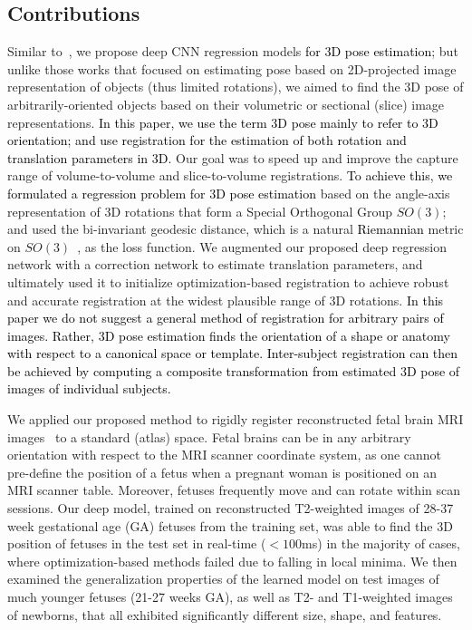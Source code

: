 \documentclass[journal,transmag]{IEEEtran}
\begin{document}
\subsection{Contributions}

Similar to~\cite{miao2016real,miao2016cnn,mahendran20173d}, we propose deep CNN regression models \textcolor{black}{for 3D pose estimation}; but unlike those works that focused on estimating pose based on 2D-projected image representation of objects (thus limited rotations), we aimed to find the 3D pose of arbitrarily-oriented objects based on their volumetric or sectional (slice) image representations. \textcolor{black}{In this paper, we use the term 3D pose mainly to refer to 3D orientation; and use registration for the estimation of both rotation and translation parameters in 3D.} Our goal was to speed up and improve the capture range of volume-to-volume and slice-to-volume registrations. \textcolor{black}{To achieve this, we formulated a regression problem for 3D pose estimation} based on the angle-axis representation of 3D rotations that form a Special Orthogonal Group $SO(3)$; and used the bi-invariant geodesic distance, which is a natural \textcolor{black}{Riemannian} metric on $SO(3)$~\cite{huynh2009metrics}, as the loss function. We augmented our proposed deep regression network with a correction network to estimate translation parameters, and ultimately used it to initialize optimization-based registration to achieve robust and accurate registration at the widest plausible range of 3D rotations. \textcolor{black}{In this paper we do not suggest a general method of registration for arbitrary pairs of images. Rather, 3D pose estimation finds the orientation of a shape or anatomy with respect to a canonical space or template. Inter-subject registration can then be achieved by computing a composite transformation from estimated 3D pose of images of individual subjects.}

We applied our proposed method to rigidly register reconstructed fetal brain MRI images~\cite{gholipour2010robust} to a standard (atlas) space. Fetal brains can be in any arbitrary orientation with respect to the MRI scanner coordinate system, as one cannot pre-define the position of a fetus when a pregnant woman is positioned on an MRI scanner table. Moreover, fetuses frequently move and can rotate within scan sessions. Our deep model, trained on reconstructed T2-weighted images of 28-37 week gestational age (GA) fetuses from the training set, was able to find the 3D position of fetuses in the test set in real-time ($<100$ms) in the majority of cases, where optimization-based methods failed due to falling in local minima. We then examined the generalization properties of the learned model on test images of much younger fetuses (21-27 weeks GA), as well as T2- and T1-weighted images of newborns, that all exhibited significantly different size, shape, and features.
\end{document}
